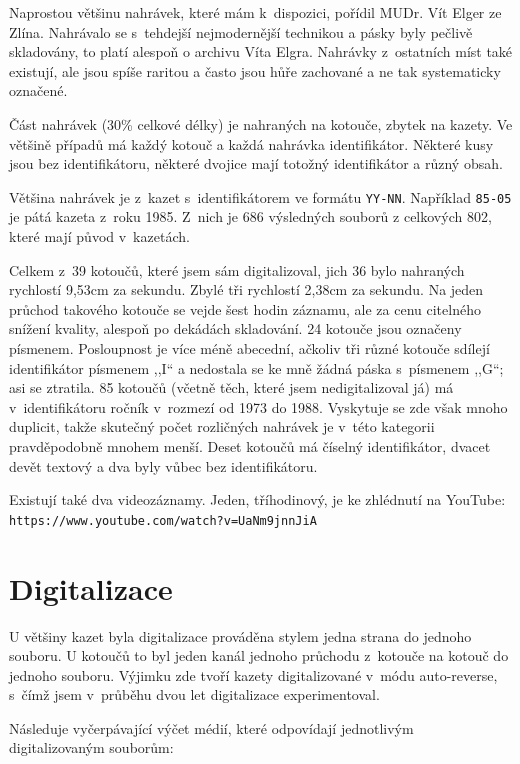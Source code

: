 Naprostou většinu nahrávek, které mám k~dispozici, pořídil MUDr. Vít Elger ze
Zlína. Nahrávalo se s~tehdejší nejmodernější technikou a pásky byly pečlivě
skladovány, to platí alespoň o archivu Víta Elgra. Nahrávky z~ostatních míst
také existují, ale jsou spíše raritou a často jsou hůře zachované a ne tak
systematicky označené.

Část nahrávek (30\% celkové délky) je nahraných na kotouče, zbytek na kazety. Ve
většině případů má každý kotouč a každá nahrávka identifikátor. Některé kusy
jsou bez identifikátoru, některé dvojice mají totožný identifikátor a různý
obsah.

Většina nahrávek je z~kazet s~identifikátorem ve formátu \texttt{YY-NN}.
Například \texttt{85-05} je pátá kazeta z~roku 1985. Z~nich je 686
výsledných souborů z celkových 802, které mají původ v~kazetách.

Celkem z~39 kotoučů, které jsem sám digitalizoval, jich 36 bylo nahraných
rychlostí 9,53cm za sekundu. Zbylé tři rychlostí 2,38cm za sekundu. Na jeden
průchod takového kotouče se vejde šest hodin záznamu, ale za cenu citelného
snížení kvality, alespoň po dekádách skladování. 24 kotouče jsou označeny
písmenem. Posloupnost je více méně abecední, ačkoliv tři různé kotouče sdílejí
identifikátor písmenem ,,I`` a nedostala se ke mně žádná páska s~písmenem
,,G``; asi se ztratila. 85 kotoučů (včetně těch, které jsem nedigitalizoval já)
má v~identifikátoru ročník v~rozmezí od 1973 do 1988. Vyskytuje se zde však
mnoho duplicit, takže skutečný počet rozličných nahrávek je v~této kategorii
pravděpodobně mnohem menší. Deset kotoučů má číselný identifikátor, dvacet devět
textový a dva byly vůbec bez identifikátoru.

Existují také dva videozáznamy. Jeden, tříhodinový, je ke zhlédnutí na YouTube:
\texttt{https://www.youtube.com/watch?v=UaNm9jnnJiA}

\section{Digitalizace}

U většiny kazet byla digitalizace prováděna stylem jedna strana do jednoho
souboru. U kotoučů to byl jeden kanál jednoho průchodu z~kotouče na kotouč do
jednoho souboru. Výjimku zde tvoří kazety digitalizované v~módu auto-reverse,
s~čímž jsem v~průběhu dvou let digitalizace experimentoval.

Následuje vyčerpávající výčet médií, které odpovídají jednotlivým
digitalizovaným souborům:

